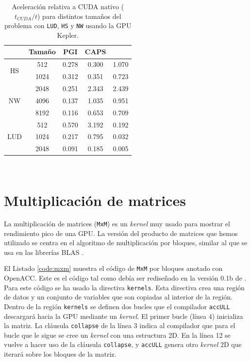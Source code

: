 \begin{table}[htb]
\caption{Aceleración relativa a CUDA nativo ($t_{CUDA} / t$) 
		para distintos tamaños del problema con 
         \texttt{LUD}, \texttt{HS} y \texttt{NW} usando la GPU Kepler.}
\label{table:rodinia:kepler}
\newcommand{\m}{\hphantom{$-$}}
\renewcommand{\tabcolsep}{4pt} %
\renewcommand{\arraystretch}{1.2} %
\centering
\begin{tabular}{@{}ccccc}
\hline 
       & Tamaño & PGI & CAPS    & \accULL{} \\
\hline
\multirow{2}{*}{HS}  
       &  512  &  0.278      &  0.300  &  1.070    \\
       & 1024  &  0.312      &  0.351  &  0.723    \\
\hline
\multirow{3}{*}{NW}  
       & 2048  &  0.251      &  2.343  &  2.439    \\ 
       & 4096  &  0.137      &  1.035  &  0.951    \\
       & 8192  &  0.116      &  0.653  &  0.709    \\
\hline
\multirow{3}{*}{LUD}  
       &  512  &  0.570      &  3.192  &  0.192    \\
       & 1024  &  0.217      &  0.795  &  0.032    \\
       & 2048  &  0.091      &  0.185  &  0.005    \\
\hline
\end{tabular}\\[2pt]
\end{table}

\section{Multiplicación de matrices}

La multiplicación de matrices (\texttt{MxM}) es un \textit{kernel} muy usado para mostrar 
el rendimiento pico de una GPU. La versión del producto de matrices que hemos utilizado se 
centra en el algoritmo de multiplicación por bloques, similar al que se usa en las 
librerías BLAS \cite{Dongarra:1990:ASL}.

El Listado \ref{code:mxm} muestra el código de \texttt{MxM} por bloques anotado con 
OpenACC. Este es el código tal como debía ser rediseñado en la versión 0.1b de \accULL{}.
Para este código se ha usado la directiva \texttt{kernels}. Esta directiva crea una 
región de datos y un conjunto de variables que son copiadas al interior de la región. 
Dentro de la región \texttt{kernels} se definen dos bucles que el compilador 
\texttt{accULL} descargará hacia la GPU mediante un \textit{kernel}. El primer bucle 
(línea 4)  inicializa la matriz. La cláusula \texttt{collapse} de la línea 3 indica al 
compilador que para el bucle que le sigue se cree un \textit{kernel} con una estructura 
2D. %
En la línea 12 se vuelve a hacer uso de la cláusula \texttt{collapse}, y 
\texttt{accULL} genera otro \textit{kernel} 2D que iterará sobre los bloques de la matriz. 

